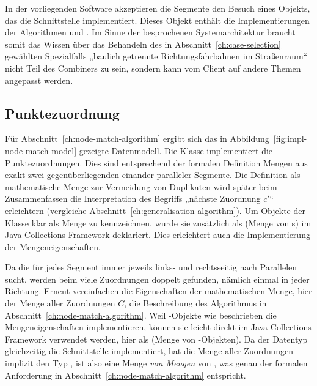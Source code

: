 \documentclass[../main/thesis.tex]{subfiles}
\begin{document}
In der vorliegenden Software akzeptieren die Segmente den Besuch eines Objekts, das die Schnittstelle  implementiert.
Dieses Objekt enthält die Implementierungen der Algorithmen  und .
Im Sinne der besprochenen Systemarchitektur braucht somit das Wissen über das Behandeln des in Abschnitt~\ref{ch:case-selection} gewählten Spezialfalls „baulich getrennte Richtungsfahrbahnen im Straßenraum“ nicht Teil des Combiners zu sein, sondern kann vom Client auf andere Themen angepasst werden.



\subsection{Punktezuordnung}
\label{ch:impl-node-match}

Für Abschnitt~\ref{ch:node-match-algorithm} ergibt sich das in Abbildung~\ref{fig:impl-node-match-model} gezeigte Datenmodell.
Die Klasse  implementiert die Punktezuordnungen.
Dies sind entsprechend der formalen Definition Mengen aus exakt zwei gegenüberliegenden  einander paralleler Segmente.
Die Definition als mathematische Menge zur Vermeidung von Duplikaten wird später beim Zusammenfassen die Interpretation des Begriffs „nächste Zuordnung $c'$“ erleichtern (vergleiche Abschnitt~\ref{ch:generalisation-algorithm}).
Um Objekte der Klasse  klar als Menge zu kennzeichnen, wurde sie zusätzlich als  (Menge von s) im Java Collections Framework deklariert.
Dies erleichtert auch die Implementierung der Mengeneigenschaften.


Da die  für jedes Segment immer jeweils links- und rechtsseitig nach Parallelen sucht, werden beim  viele Zuordnungen doppelt gefunden, nämlich einmal in jeder Richtung.
Erneut vereinfachen die Eigenschaften der mathematischen Menge, hier der Menge aller Zuordnungen $C$, die Beschreibung des Algorithmus in Abschnitt~\ref{ch:node-match-algorithm}.
Weil -Objekte wie beschrieben die Mengeneigenschaften implementieren, können sie leicht direkt im Java Collections Framework verwendet werden, hier als  (Menge von -Objekten).
Da der Datentyp  gleichzeitig die Schnittstelle  implementiert, hat die Menge aller Zuordnungen implizit den Typ , ist also eine Menge \emph{von Mengen} von , was genau der formalen Anforderung in Abschnitt~\ref{ch:node-match-algorithm} entspricht.
\end{document}
